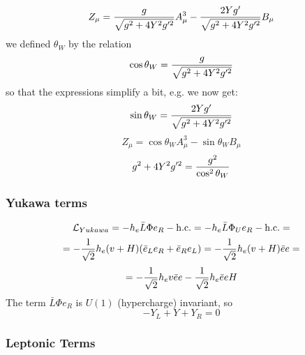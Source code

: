 \begin{equation*}
  Z_\mu = {g\over\sqrt{g^2+4Y^2g'^2}}A^3_\mu- {2Yg'\over\sqrt{g^2+4Y^2g'^2}}B_\mu
\end{equation*}
we defined $\theta_W$ by the relation 
\begin{equation*}
  \cos\theta_W = {g\over\sqrt{g^2+4Y^2g'^2}}
\end{equation*}
so that the expressions simplify a bit, e.g. we now get: 
\begin{equation*}
  \sin\theta_W = {2Yg'\over\sqrt{g^2+4Y^2g'^2}}
\end{equation*}
\begin{equation*}
  Z_\mu= \cos\theta_W A^3_\mu - \sin\theta_W B_\mu
\end{equation*}
\begin{equation*}
  g^2+4Y^2g'^2 = {g^2\over\cos^2\theta_W}
\end{equation*}
\subsubsection{Yukawa terms}

\begin{equation*}
  {\mathcal L}_{Yukawa} = -h_e \bar L \Phi e_R - \hbox{h.c.}= -h_e \bar L \Phi_U e_R - \hbox{h.c.}=
\end{equation*}
\begin{equation*}
  =-{1\over\sqrt2}h_e(v+H)(\bar e_L e_R + \bar e_R e_L)= -{1\over\sqrt2}h_e(v+H)\bar ee=
\end{equation*}
\begin{equation*}
  =-{1\over\sqrt2}h_ev\bar ee-{1\over\sqrt2}h_e\bar eeH
\end{equation*}
The term $\bar L \Phi e_R$ is $U(1)$ (hypercharge) invariant, so 
\begin{equation*}
  -Y_L+Y+Y_R=0
\end{equation*}
\subsubsection{Leptonic Terms}

